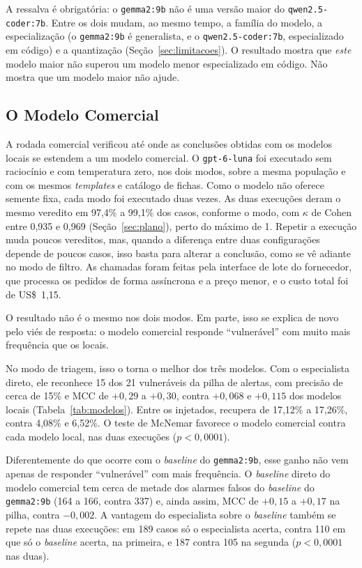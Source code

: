 {\sloppy A ressalva é obrigatória: o \texttt{gemma2:9b} não é uma versão maior do \texttt{qwen2.5-coder:7b}. Entre os dois mudam, ao mesmo tempo, a família do modelo, a especialização (o \texttt{gemma2:9b} é generalista, e o \texttt{qwen2.5-coder:7b}, especializado em código) e a quantização (Seção~\ref{sec:limitacoes}). O resultado mostra que \textit{este} modelo maior não superou um modelo menor especializado em código. Não mostra que um modelo maior não ajude.\par}

\subsection{O Modelo Comercial}
\label{subsec:modelocomercial}

A rodada comercial verificou até onde as conclusões obtidas com os modelos locais se estendem a um modelo comercial. O \texttt{gpt-6-luna} foi executado sem raciocínio e com temperatura zero, nos dois modos, sobre a mesma população e com os mesmos \textit{templates} e catálogo de fichas. Como o modelo não oferece semente fixa, cada modo foi executado duas vezes. As duas execuções deram o mesmo veredito em 97,4\% a 99,1\% dos casos, conforme o modo, com $\kappa$ de Cohen entre 0,935 e 0,969 (Seção~\ref{sec:plano}), perto do máximo de 1. Repetir a execução muda poucos vereditos, mas, quando a diferença entre duas configurações depende de poucos casos, isso basta para alterar a conclusão, como se vê adiante no modo de filtro. As chamadas foram feitas pela interface de lote do fornecedor, que processa os pedidos de forma assíncrona e a preço menor, e o custo total foi de US\$~1,15.

O resultado não é o mesmo nos dois modos. Em parte, isso se explica de novo pelo viés de resposta: o modelo comercial responde ``vulnerável'' com muito mais frequência que os locais.

No modo de triagem, isso o torna o melhor dos três modelos. Com o especialista direto, ele reconhece 15 dos 21 vulneráveis da pilha de alertas, com precisão de cerca de 15\% e MCC de $+0{,}29$ a $+0{,}30$, contra $+0{,}068$ e $+0{,}115$ dos modelos locais (Tabela~\ref{tab:modelos}). Entre os injetados, recupera de 17,12\% a 17,26\%, contra 4,08\% e 6,52\%. O teste de McNemar favorece o modelo comercial contra cada modelo local, nas duas execuções ($p < 0{,}0001$).

Diferentemente do que ocorre com o \textit{baseline} do \texttt{gemma2:9b}, esse ganho não vem apenas de responder ``vulnerável'' com mais frequência. O \textit{baseline} direto do modelo comercial tem cerca de metade dos alarmes falsos do \textit{baseline} do \texttt{gemma2:9b} (164 a 166, contra 337) e, ainda assim, MCC de $+0{,}15$ a $+0{,}17$ na pilha, contra $-0{,}002$. A vantagem do especialista sobre o \textit{baseline} também se repete nas duas execuções: em 189 casos só o especialista acerta, contra 110 em que só o \textit{baseline} acerta, na primeira, e 187 contra 105 na segunda ($p < 0{,}0001$ nas duas).

